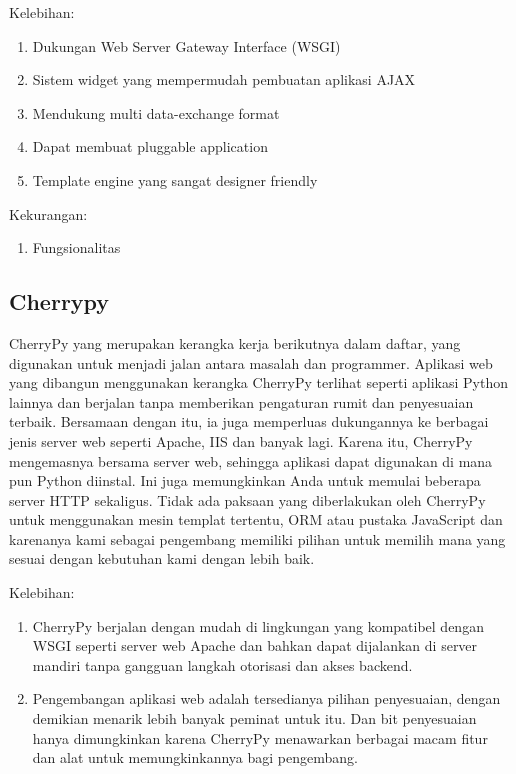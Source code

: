 Kelebihan:
\begin{enumerate}
\item Dukungan Web Server Gateway Interface (WSGI)
\item Sistem widget yang mempermudah pembuatan aplikasi AJAX
\item Mendukung multi data-exchange format
\item Dapat membuat pluggable application
\item Template engine yang sangat designer friendly
\end{enumerate}

Kekurangan:
\begin{enumerate}
\item Fungsionalitas
\end{enumerate}

\subsection{Cherrypy}

CherryPy yang merupakan kerangka kerja berikutnya dalam daftar, yang digunakan untuk menjadi jalan antara masalah dan programmer. Aplikasi web yang dibangun menggunakan kerangka CherryPy terlihat seperti aplikasi Python lainnya dan berjalan tanpa memberikan pengaturan rumit dan penyesuaian terbaik. Bersamaan dengan itu, ia juga memperluas dukungannya ke berbagai jenis server web seperti Apache, IIS dan banyak lagi. Karena itu, CherryPy mengemasnya bersama server web, sehingga aplikasi dapat digunakan di mana pun Python diinstal. Ini juga memungkinkan Anda untuk memulai beberapa server HTTP sekaligus. Tidak ada paksaan yang diberlakukan oleh CherryPy untuk menggunakan mesin templat tertentu, ORM atau pustaka JavaScript dan karenanya kami sebagai pengembang memiliki pilihan untuk memilih mana yang sesuai dengan kebutuhan kami dengan lebih baik.

Kelebihan:
\begin{enumerate}
\item CherryPy berjalan dengan mudah di lingkungan yang kompatibel dengan WSGI seperti server web Apache dan bahkan dapat dijalankan di server mandiri tanpa gangguan langkah otorisasi dan akses backend.
\item Pengembangan aplikasi web adalah tersedianya pilihan penyesuaian, dengan demikian menarik lebih banyak peminat untuk itu. Dan bit penyesuaian hanya dimungkinkan karena CherryPy menawarkan berbagai macam fitur dan alat untuk memungkinkannya bagi pengembang.
\end{enumerate}

